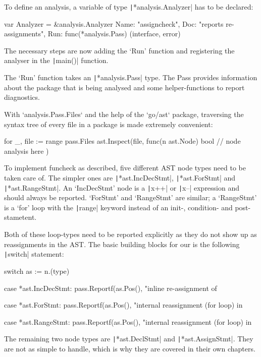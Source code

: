 To define an analysis, a variable of type \texttt|*analysis.Analyzer| has to be declared:

\begin{gocode}
var Analyzer = &analysis.Analyzer{
	Name: "assigncheck",
	Doc:  "reports re-assignments",
	Run:  func(*analysis.Pass) (interface{}, error)
}
\end{gocode}
The necessary steps are now adding the `Run' function and registering the analyser
in the \texttt|main()| function.

The `Run' function takes an \texttt|*analysis.Pass| type. The Pass provides
information about the package that is being analysed and some helper-functions to report
diagnostics.

With `analysis.Pass.Files` and the help of the `go/ast` package, traversing the syntax
tree of every file in a package is made extremely convenient:

\begin{gocode}
for _, file := range pass.Files {
	ast.Inspect(file, func(n ast.Node) bool {
		// node analysis here
	})
}
\end{gocode}
To implement funcheck as described, five different AST node types need to be
taken care of. The simpler ones are
\texttt|*ast.IncDecStmt|, \texttt|*ast.ForStmt| and \texttt|*ast.RangeStmt|.
An `IncDecStmt' node is a \texttt|x++| or \texttt|x--|
expression and should always be reported.
`ForStmt' and `RangeStmt' are similar; a `RangeStmt' is a `for' loop with the
\texttt|range| keyword instead of an init-, condition- and post-stametent.

Both of these loop-types need to be reported explicitly as they do not show up
as reassignments in the AST.
The basic building blocks for our is the following \texttt|switch|
statement:

\begin{gocode}
switch as := n.(type) {
case *ast.IncDecStmt:
	pass.Reportf(as.Pos(), "inline re-assignment of %

case *ast.ForStmt:
	pass.Reportf(as.Pos(), "internal reassignment (for loop) in %

case *ast.RangeStmt:
	pass.Reportf(as.Pos(), "internal reassignment (for loop) in %
}
\end{gocode}
The remaining two node types are \texttt|*ast.DeclStmt| and \texttt|*ast.AssignStmt|.
They are not as simple to handle, which is why they are covered in their own chapters.

